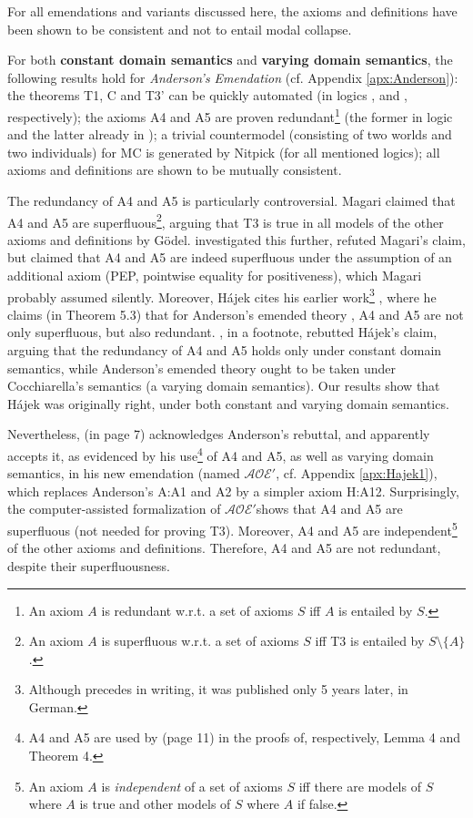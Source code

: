 \documentclass{birkjour}
\newcommand{\AOEH}{$\mathcal{AOE}'$}
\theoremstyle{definition}
\theoremstyle{remark}
\numberwithin{equation}{section}
\begin{document}
For all emendations and variants discussed here, the axioms and definitions have been shown to be consistent and 
not to entail modal collapse. 

For both \textbf{constant domain semantics} and \textbf{varying domain semantics}, the following results hold for \emph{Anderson's Emendation} (cf. Appendix \ref{apx:Anderson}): 
%
the theorems T1, C and T3' can be quickly automated (in logics \K, \K and \KB, respectively);
%
the axioms A4 and A5 are proven redundant\footnote{
  An axiom $A$ is redundant w.r.t. a set of axioms $S$ iff $A$ is entailed by $S$. 
} (the former in
logic \KFourB and the latter already in \K);
%
a trivial countermodel (consisting of two worlds and 
two individuals) for MC is generated by Nitpick (for all mentioned logics); all axioms and definitions are shown to be mutually consistent. 

The redundancy of A4 and A5 is particularly controversial. Magari \cite{Magari1988} claimed that A4 and A5 are superfluous\footnote{
  An axiom $A$ is superfluous w.r.t. a set of axioms $S$ iff T3 is entailed by $S \setminus \{ A \}$.
}, arguing that T3 is true in all models of the other axioms and definitions by Gödel. \citet[p.~5-6]{Hajek_Magari_and_others_1996} investigated this further, refuted Magari's claim, but claimed that A4 and A5 are indeed superfluous under the assumption of an additional axiom (PEP, pointwise equality for positiveness), which Magari probably assumed silently. Moreover, Hájek \citet[p.~2]{Hajek_Magari_and_others_1996} cites his earlier work\footnote{Although \citep{Hajek_der_Mathematiker_2001} precedes \citep{Hajek_Magari_and_others_1996} in writing, it was published only 5 years later, in German.} \citep{Hajek_der_Mathematiker_2001}, where he claims (in Theorem 5.3) that for Anderson's emended theory \citep{anderson90:_some_emend_of_goedel_ontol_proof}, A4 and A5 are not only superfluous, but also redundant. \citet[footnote 1 in p.~1]{AndersonGettings}, in a footnote, rebutted Hájek's claim, arguing that the redundancy of A4 and A5 holds only under constant domain semantics, while Anderson's emended theory ought to be taken under Cocchiarella's semantics \citep{Cocchiarella} (a varying domain semantics). Our results show that Hájek was originally right, under both constant and varying domain semantics.

Nevertheless, \citet[p.~7]{Hajek2002} (in page 7) acknowledges Anderson's rebuttal, and apparently accepts it, as evidenced by  his use\footnote{
  A4 and A5 are used by \citet[p.~11]{Hajek2002} (page 11) in the proofs of, respectively, Lemma 4 and Theorem 4.
} 
of A4 and A5, as well as varying domain semantics, in his new emendation (named \AOEH \citep[sec.~4]{Hajek2002}, cf. Appendix \ref{apx:Hajek1}), which replaces Anderson's A:A1 and A2 by a simpler axiom H:A12. Surprisingly, the computer-assisted formalization of \AOEH shows that A4 and A5 are superfluous (not needed for proving T3). Moreover, A4 and A5 are independent\footnote{
  An axiom $A$ is \emph{independent} of a set of axioms $S$ iff there are models of $S$ where $A$ is true and other models of $S$ where $A$ if false. 
} of the other axioms and definitions. Therefore, A4 and A5 are not redundant, despite their superfluousness. 
\end{document}
